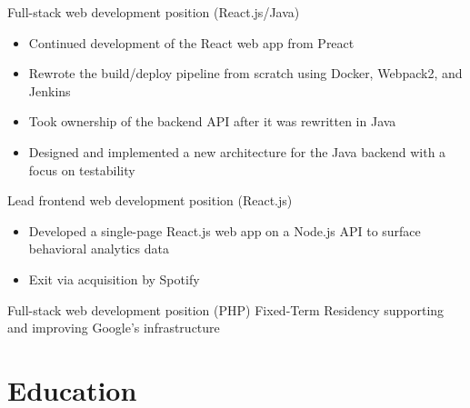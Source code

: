 	{Full-stack web development position (React.js/Java)}{
	\begin{itemize}
	\item Continued development of the React web app from Preact
	\item Rewrote the build/deploy pipeline from scratch using Docker, Webpack2, and Jenkins
	\item Took ownership of the backend API after it was rewritten in Java
	\item Designed and implemented a new architecture for the Java backend with a focus on testability
	\end{itemize}
}
	{Lead frontend web development position (React.js)}{
	\begin{itemize}
	\item Developed a single-page React.js web app on a Node.js API to surface behavioral analytics data
	\item Exit via acquisition by Spotify
	\end{itemize}
}
	{Full-stack web development position (PHP)}{}
	{Fixed-Term Residency supporting and improving Google's infrastructure}{}

\section{Education}

